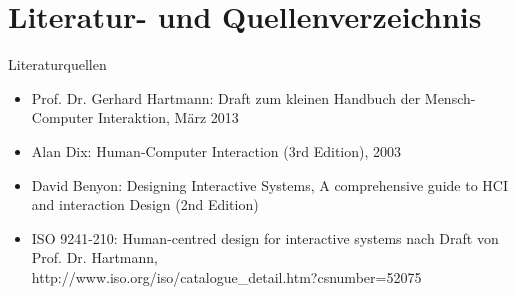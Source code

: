 
\chapter*{Literatur- und Quellenverzeichnis}
Literaturquellen 
\begin{itemize}
\item
Prof. Dr. Gerhard Hartmann: Draft zum kleinen Handbuch der Mensch-Computer Interaktion, März 2013
\item
Alan Dix: Human-Computer Interaction (3rd Edition), 2003
\item 
David Benyon: Designing Interactive Systems, A comprehensive guide to HCI and interaction Design (2nd Edition) 
\item
ISO 9241-210: Human-centred design for interactive systems nach Draft von Prof. Dr. Hartmann,
\\http://www.iso.org/iso/catalogue\_detail.htm?csnumber=52075

\end{itemize}

